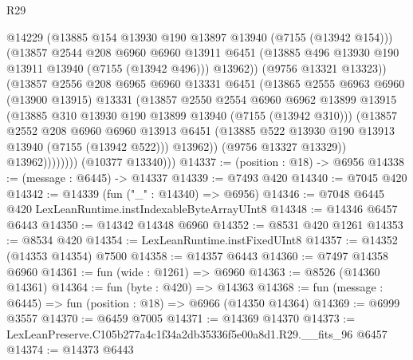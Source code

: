 \begin{lexlean}{R29}
\begin{coremodule}
                          @14229
                          (@13885 @154 @13930 @190 @13897 @13940 (@7155 (@13942 @154)))
                          (@13857
                            @2544
                            @208
                            @6960
                            @6960
                            @13911
                            @6451
                            (@13885 @496 @13930 @190 @13911 @13940 (@7155 (@13942 @496)))
                            @13962))
                        (@9756 @13321 @13323))
                      (@13857
                        @2556
                        @208
                        @6965
                        @6960
                        @13331
                        @6451
                        (@13865
                          @2555
                          @6963
                          @6960
                          (@13900 @13915)
                          @13331
                          (@13857
                            @2550
                            @2554
                            @6960
                            @6962
                            @13899
                            @13915
                            (@13885 @310 @13930 @190 @13899 @13940 (@7155 (@13942 @310)))
                            (@13857
                              @2552
                              @208
                              @6960
                              @6960
                              @13913
                              @6451
                              (@13885 @522 @13930 @190 @13913 @13940 (@7155 (@13942 @522)))
                              @13962))
                          (@9756 @13327 @13329))
                        @13962))))))))
        (@10377 @13340)))
@14337 := (position : @18) -> @6956
@14338 := (message : @6445) -> @14337
@14339 := @7493 @420
@14340 := @7045 @420
@14342 := @14339 (fun ("_" : @14340) => @6956)
@14346 := @7048 @6445 @420 LexLeanRuntime.instIndexableByteArrayUInt8
@14348 := @14346 @6457 @6443
@14350 := @14342 @14348 @6960
@14352 := @8531 @420 @1261
@14353 := @8534 @420
@14354 := LexLeanRuntime.instFixedUInt8
@14357 := @14352 (@14353 @14354) @7500
@14358 := @14357 @6443
@14360 := @7497 @14358 @6960
@14361 := fun (wide : @1261) => @6960
@14363 := @8526 (@14360 @14361)
@14364 := fun (byte : @420) => @14363
@14368 := fun (message : @6445) => fun (position : @18) => @6966 (@14350 @14364)
@14369 := @6999 @3557
@14370 := @6459 @7005
@14371 := @14369 @14370
@14373 := LexLeanPreserve.C105b277a4c1f34a2db35336f5e00a8d1.R29.__fits_96 @6457
@14374 := @14373 @6443

\end{coremodule}
\end{lexlean}
